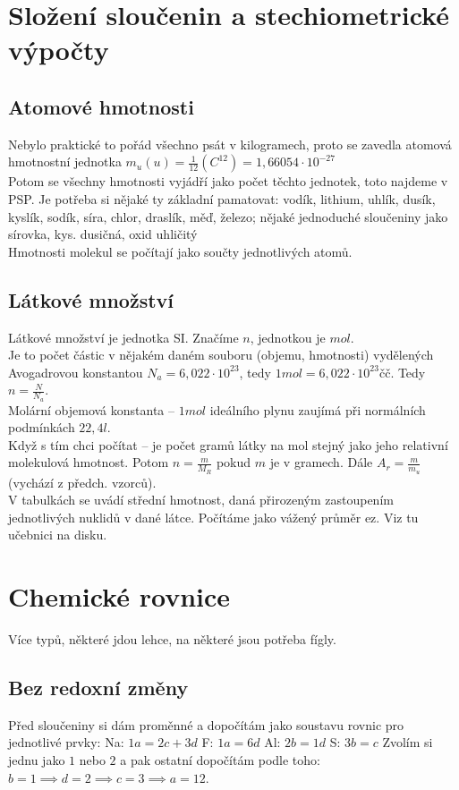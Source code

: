 \documentclass{article}
\begin{document}
\section{Složení sloučenin a stechiometrické výpočty}

\subsection{Atomové hmotnosti}
Nebylo praktické to pořád všechno psát v kilogramech, proto se zavedla atomová hmotnostní jednotka $m_u (u) = \frac{1}{12}(C^{12}) = 1,66054 \cdot 10^{-27}$\\
Potom se všechny hmotnosti vyjádří jako počet těchto jednotek, toto najdeme v PSP. Je potřeba si nějaké ty základní pamatovat: vodík, lithium, uhlík, dusík, kyslík, sodík, síra, chlor, draslík, měď, železo; nějaké jednoduché sloučeniny jako sírovka, kys. dusičná, oxid uhličitý\\
Hmotnosti molekul se počítají jako součty jednotlivých atomů.

\subsection{Látkové množství}
Látkové množství je jednotka SI. Značíme $n$, jednotkou je $mol$.\\
Je to počet částic v nějakém daném souboru (objemu, hmotnosti) vydělených Avogadrovou konstantou $N_a = 6,022 \cdot 10^23$, tedy $1 mol = 6,022 \cdot 10^23 \text{čč}$. Tedy $n = \frac{N}{N_a}$.\\
Molární objemová konstanta -- $1 mol$ ideálního plynu zaujímá při normálních podmínkách $22,4 l$.\\
Když s tím chci počítat --  je počet gramů látky na mol stejný jako jeho relativní molekulová hmotnost. Potom $n = \frac{m}{M_R}$ pokud $m$ je v gramech. Dále $A_r = \frac{m}{m_u}$ (vychází z předch. vzorců).\\
V tabulkách se uvádí střední hmotnost, daná přirozeným zastoupením jednotlivých nuklidů v dané látce. Počítáme jako vážený průměr ez. Viz tu učebnici na disku.

\section{Chemické rovnice}
Více typů, některé jdou lehce, na některé jsou potřeba fígly.

\subsection{Bez redoxní změny}
Před sloučeniny si dám proměnné a dopočítám jako soustavu rovnic pro jednotlivé prvky: 
Na: $1a = 2c + 3d$
F: $1a = 6d$
Al: $2b = 1d$
S: $3b = c$
Zvolím si jednu jako $1$ nebo $2$ a pak ostatní dopočítám podle toho: $b=1 \implies d = 2 \implies c = 3 \implies a = 12$.
\end{document}
